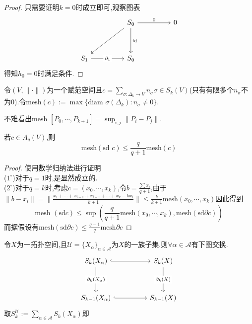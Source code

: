 \documentclass{article}
\begin{document}
\begin{proof}
    只需要证明$k = 0$时成立即可,观察图表
    \[\begin{tikzcd}
        && {S_0} && 0 \\
        \\
        {S_1} && {S_0}
        \arrow["0", from=1-3, to=1-5]
        \arrow["{\text{id}}", from=1-3, to=3-3]
        \arrow[from=1-3, to=3-1]
        \arrow["{\partial_1}"{description}, from=3-1, to=3-3]
    \end{tikzcd}\]
    得知$h_0 = 0$时满足条件.
\end{proof}
\begin{definition}
    令$(V,\|\cdot\|)$为一个赋范空间且$c = \sum_{\sigma : \Delta_k \to V} n_{\sigma} \sigma \in S_k(V)$(只有有限多个$n_{\sigma}$不为$0$).令$\text{mesh}(c) := \max \{\text{diam }\sigma(\Delta_k) : n_{\sigma}\neq 0\}$.
\end{definition}
不难看出$\text{mesh }[P_0,\cdots,P_{k+1}] = \sup_{i,j} \| P_i - P_j\|$.
\begin{lemma}
    若$c \in A_q(V)$,则
    $$
    \text{mesh}(\text{sd }c) \leq \frac{q}{q+1}\text{mesh}(c)
    $$
    \label{lem:3.6.4}
\end{lemma}
\begin{proof}
    使用数学归纳法进行证明\\
    ($1^\circ$)对于$q = 1$时,是显然成立的.\\
    ($2^\circ$)对于$q = k$时,考虑$c = (x_0,\cdots,x_k)$,令$b = \frac{\sum x_i}{q+1}$,由于$\|b - x_i\| = \|\frac{x_1+\cdots+x_{i-1}+x_{i+1}+\cdots+x_k-kx_i}{k+1}\|\leq \frac{k}{k+1}\text{mesh}(x_0,\cdots,x_k)$因此得到
    $$
    \text{mesh }(\text{sd}c) \leq \sup (\frac{q}{q+1}\text{mesh}(x_0,\cdots,x_k),\text{mesh}(\text{sd}\partial c))
    $$
    而据假设有$\text{mesh}(\text{sd} \partial c)\leq \frac{q-1}{q}\text{mesh}\partial c$
\end{proof}
令$X$为一拓扑空间,且$\mathcal{U} = \{X_{\alpha}\}_{\alpha \in \mathscr{A}}$为$X$的一族子集.则$\forall \alpha \in \mathscr{A}$有下图交换.
\[\begin{tikzcd}
	{S_k(X_\alpha)} && {S_k(X)} \\
	\\
	{S_{k-1}(X_\alpha)} && {S_{k-1}(X)}
	\arrow[hook, from=1-1, to=1-3]
	\arrow[hook, from=3-1, to=3-3]
	\arrow["{\partial_k(X_\alpha)}"{description}, from=1-1, to=3-1]
	\arrow["{\partial_k(X)}"{description}, from=1-3, to=3-3]
\end{tikzcd}\]
取$S_k^\mathcal{U} := \sum_{\alpha \in \mathscr{A}}S_k(X_\alpha)$即
\end{document}
